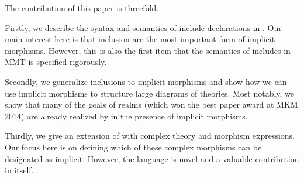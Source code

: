 The contribution of this paper is threefold.

Firstly, we describe the syntax and semantics of include declarations in \mmt.
Our main interest here is that inclusion are the most important form of implicit morphisms.
However, this is also the first item that the semantics of includes in MMT is specified rigorously.

Secondly, we generalize inclusions to implicit morphisms and show how we can use implicit morphisms to structure large diagrams of theories.
Most notably, we show that many of the goals of realms \cite{realms} (which won the best paper award at MKM 2014) are already realized by \mmt in the presence of implicit morphisms.

Thirdly, we give an extension of \mmt with complex theory and morphism expressions.
Our focus here is on defining which of these complex morphisms can be designated as implicit.
However, the language is novel and a valuable contribution in itself.